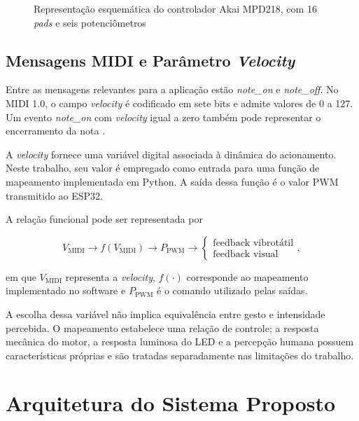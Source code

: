 \begin{figure}[!htbp]
\centering
\resizebox{0.93\linewidth}{!}{}
\caption{Representação esquemática do controlador Akai MPD218, com 16 \textit{pads} e seis potenciômetros}
\label{fig:mpd218_esquematico}
\end{figure}

\subsection{Mensagens MIDI e Parâmetro \textit{Velocity}}
\label{subsec:velocity_midi}

Entre as mensagens relevantes para a aplicação estão \textit{note\_on} e \textit{note\_off}. No MIDI 1.0, o campo \textit{velocity} é codificado em sete bits e admite valores de 0 a 127. Um evento \textit{note\_on} com \textit{velocity} igual a zero também pode representar o encerramento da nota \cite{midi1996}.

A \textit{velocity} fornece uma variável digital associada à dinâmica do acionamento. Neste trabalho, seu valor é empregado como entrada para uma função de mapeamento implementada em Python. A saída dessa função é o valor PWM transmitido ao ESP32.

A relação funcional pode ser representada por

\begin{equation}
V_{\mathrm{MIDI}}
\longrightarrow
f(V_{\mathrm{MIDI}})
\longrightarrow
P_{\mathrm{PWM}}
\longrightarrow
\left\{
\begin{array}{l}
\text{feedback vibrotátil}\\
\text{feedback visual}
\end{array}
\right.,
\end{equation}

em que $V_{\mathrm{MIDI}}$ representa a \textit{velocity}, $f(\cdot)$ corresponde ao mapeamento implementado no software e $P_{\mathrm{PWM}}$ é o comando utilizado pelas saídas.

A escolha dessa variável não implica equivalência entre gesto e intensidade percebida. O mapeamento estabelece uma relação de controle; a resposta mecânica do motor, a resposta luminosa do LED e a percepção humana possuem características próprias e são tratadas separadamente nas limitações do trabalho.

\section{Arquitetura do Sistema Proposto}
\label{sec:arquitetura_sistema}

